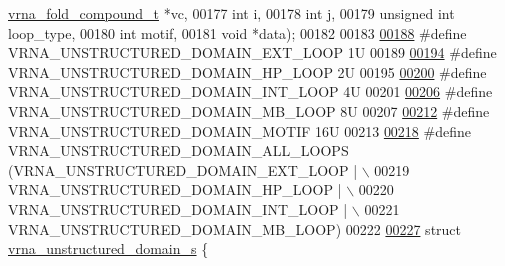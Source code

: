 \begin{DoxyCode}
      \mbox{\hyperlink{group__fold__compound_structvrna__fc__s}{vrna\_fold\_compound\_t}}  *vc,
00177                                                 \textcolor{keywordtype}{int}                   i,
00178                                                 \textcolor{keywordtype}{int}                   j,
00179                                                 \textcolor{keywordtype}{unsigned} \textcolor{keywordtype}{int}          loop\_type,
00180                                                 \textcolor{keywordtype}{int}                   motif,
00181                                                 \textcolor{keywordtype}{void}                  *data);
00182 
00183 
\mbox{\hyperlink{group__domains__up_gaac911374e86236a51bfd42e1f098eaba}{00188}} \textcolor{preprocessor}{#define VRNA\_UNSTRUCTURED\_DOMAIN\_EXT\_LOOP    1U}
00189 
\mbox{\hyperlink{group__domains__up_ga23b610ea9564346c45cc1e2bbb62adf7}{00194}} \textcolor{preprocessor}{#define VRNA\_UNSTRUCTURED\_DOMAIN\_HP\_LOOP     2U}
00195 
\mbox{\hyperlink{group__domains__up_gac4a0feccd9654c149203200248c2716b}{00200}} \textcolor{preprocessor}{#define VRNA\_UNSTRUCTURED\_DOMAIN\_INT\_LOOP    4U}
00201 
\mbox{\hyperlink{group__domains__up_ga67b80796655e5227a4ed662bfbe398b0}{00206}} \textcolor{preprocessor}{#define VRNA\_UNSTRUCTURED\_DOMAIN\_MB\_LOOP     8U}
00207 
\mbox{\hyperlink{group__domains__up_gaab12b58d59be76446a9f76fad2fe624c}{00212}} \textcolor{preprocessor}{#define VRNA\_UNSTRUCTURED\_DOMAIN\_MOTIF       16U}
00213 
\mbox{\hyperlink{group__domains__up_ga3c6be4cce70f1af9e885788856101699}{00218}} \textcolor{preprocessor}{#define VRNA\_UNSTRUCTURED\_DOMAIN\_ALL\_LOOPS   (VRNA\_UNSTRUCTURED\_DOMAIN\_EXT\_LOOP | \(\backslash\)}
00219 \textcolor{preprocessor}{                                              VRNA\_UNSTRUCTURED\_DOMAIN\_HP\_LOOP | \(\backslash\)}
00220 \textcolor{preprocessor}{                                              VRNA\_UNSTRUCTURED\_DOMAIN\_INT\_LOOP | \(\backslash\)}
00221 \textcolor{preprocessor}{                                              VRNA\_UNSTRUCTURED\_DOMAIN\_MB\_LOOP)}
00222 
\mbox{\hyperlink{group__domains__up}{00227}} \textcolor{keyword}{struct }\mbox{\hyperlink{group__domains__up_structvrna__unstructured__domain__s}{vrna\_unstructured\_domain\_s}} \{

\end{DoxyCode}
